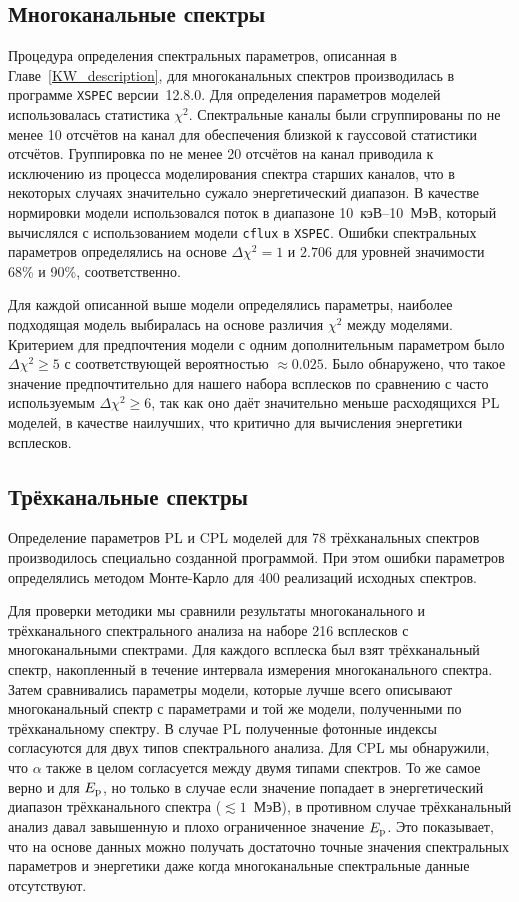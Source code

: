 \subsection{Многоканальные спектры}
Процедура определения спектральных параметров, описанная в Главе~\ref{KW_description}, 
для многоканальных спектров производилась в программе 
\texttt{XSPEC}\citep{Arnaud_1996ASPC} версии~12.8.0.
Для определения параметров моделей использовалась статистика $\chi^2$. 
Спектральные каналы были сгруппированы по не менее 10 отсчётов на канал для обеспечения 
близкой к гауссовой статистики отсчётов. Группировка по не менее 20 отсчётов на канал 
приводила к исключению из процесса моделирования спектра старших каналов, 
что в некоторых случаях значительно сужало энергетический диапазон. 
В качестве нормировки модели использовался поток в диапазоне 10~кэВ--10~МэВ, 
который вычислялся с использованием модели \texttt{cflux} в \texttt{XSPEC}.
Ошибки спектральных параметров определялись на основе $\Delta \chi^2 = 1$ и $2.706$ для уровней 
значимости 68\% и 90\%, соответственно.

Для каждой описанной выше модели определялись параметры, наиболее подходящая 
модель выбиралась на основе различия $\chi^2$ между моделями. Критерием для предпочтения
модели с одним дополнительным параметром было $\Delta \chi^2 \geq 5$ с соответствующей 
вероятностью $\approx 0.025$. Было обнаружено, что такое значение предпочтительно 
для нашего набора всплесков по сравнению с часто используемым $\Delta \chi^2 \geq 6$,
так как оно даёт значительно меньше расходящихся PL моделей, в качестве наилучших,
что критично для вычисления энергетики всплесков.

\subsection{Трёхканальные спектры}
Определение параметров PL и CPL моделей для 78 трёхканальных спектров производилось 
специально созданной программой. При этом ошибки параметров определялись методом Монте-Карло
для 400 реализаций исходных спектров.

Для проверки методики мы сравнили результаты многоканального и трёхканального спектрального анализа
на наборе 216 всплесков с многоканальными спектрами.
Для каждого всплеска был взят  трёхканальный спектр, накопленный в течение 
интервала измерения многоканального спектра.
Затем сравнивались параметры модели, которые лучше всего описывают многоканальный спектр
с параметрами и той же модели, полученными по трёхканальному спектру.
В случае PL полученные фотонные индексы согласуются для двух типов
спектрального анализа. Для CPL мы обнаружили, что  $\alpha$ также в целом
согласуется между двумя типами спектров. То же самое верно и для $E_{\mathrm{p}}$, но
только в случае если значение попадает в энергетический диапазон трёхканального спектра
($\lesssim 1$~МэВ), в противном случае трёхканальный анализ давал завышенную и 
плохо ограниченное значение $E_{\mathrm{p}}$. Это показывает, что на основе данных \kws 
можно получать достаточно точные значения спектральных параметров и энергетики
даже когда многоканальные спектральные данные отсутствуют.

